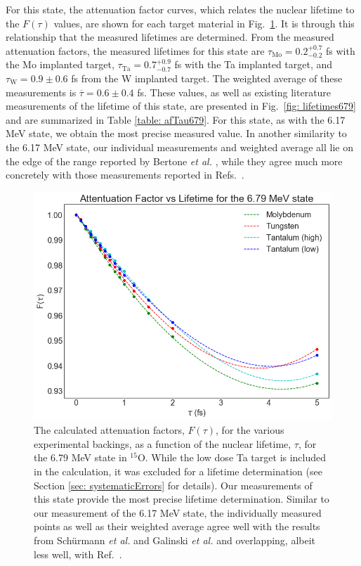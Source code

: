 For this state, the attenuation factor curves, which relates the nuclear lifetime to the $F(\tau)$ values, are shown for each target material in Fig.\ \ref{fig: attFacs679}. It is through this relationship that the measured lifetimes are determined. From the measured attenuation factors, the measured lifetimes for this state are $\tau_{\text{Mo}} = 0.2^{+0.7}_{-0.2}$ fs with the Mo implanted target, $\tau_{\text{Ta}} = 0.7^{+0.9}_{-0.7}$ fs with the Ta implanted target, and $\tau_{\text{W}} = 0.9 \pm 0.6$ fs from the W implanted target. The weighted average of these measurements is $\overline{\tau} = 0.6 \pm 0.4$ fs. These values, as well as existing literature measurements of the lifetime of this state, are presented in Fig.\ \ref{fig: lifetimes679} and are summarized in Table \ref{table: afTau679}. For this state, as with the 6.17 MeV state, we obtain the most precise measured value. In another similarity to the 6.17 MeV state, our individual measurements and weighted average all lie on the edge of the range reported by Bertone \textit{et al.} \cite{Bertone2001}, while they agree much more concretely with those measurements reported in Refs.\ \cite{Schurmann2008, Galinski2014, Michelagnoli2013}. 


\begin{figure}
\centering
\includegraphics[width=\linewidth]{figures/attFac679.png}
\caption{The calculated attenuation factors, $F(\tau)$, for the various experimental backings, as a function of the nuclear lifetime, $\tau$, for the 6.79 MeV state in $^{15}$O. While the low dose Ta target is included in the calculation, it was excluded for a lifetime determination (see Section \ref{sec: systematicErrors} for details). Our measurements of this state provide the most precise lifetime determination. Similar to our measurement of the 6.17 MeV state, the individually measured points as well as their weighted average agree well with the results from Sch{\"u}rmann \textit{et al.} \cite{Schurmann2008} and Galinski \textit{et al.} \cite{Galinski2014} and overlapping, albeit less well, with Ref.\ \cite{Bertone2001}.}
\label{fig: attFacs679}
\end{figure}


